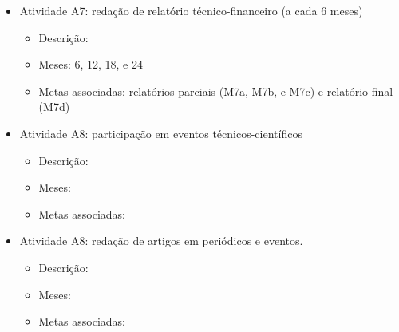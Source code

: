 \begin{itemize}
\begin{itemize}
	\end{itemize}
	\item Atividade A7: redação de relatório técnico-financeiro (a cada 6 meses)
	\begin{itemize}
		\item Descrição:
		\item Meses: 6, 12, 18, e 24
		\item Metas associadas: relatórios parciais (M7a, M7b, e M7c) e relatório final (M7d)
	\end{itemize}
	\item  Atividade A8: participação em eventos técnicos-científicos
	\begin{itemize}
		\item Descrição:
		\item Meses:
		\item Metas associadas:
	\end{itemize}
	\item Atividade A8: redação de artigos em periódicos e eventos.
	\begin{itemize}
		\item Descrição:
		\item Meses:
		\item Metas associadas:
	\end{itemize}
\end{itemize}

